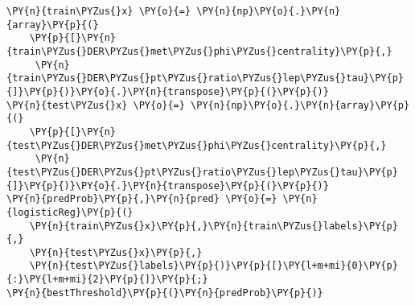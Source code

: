 {\par%
\vspace{-1\baselineskip}%
}%
\begin{notebookcell}[]%
\begin{addmargin}[\cellleftmargin]{0em}%
{\smaller%
\par%
%
\vspace{-1\smallerfontscale}%
\begin{Verbatim}[commandchars=\\\{\}]
\PY{n}{train\PYZus{}x} \PY{o}{=} \PY{n}{np}\PY{o}{.}\PY{n}{array}\PY{p}{(}
    \PY{p}{[}\PY{n}{train\PYZus{}DER\PYZus{}met\PYZus{}phi\PYZus{}centrality}\PY{p}{,}
     \PY{n}{train\PYZus{}DER\PYZus{}pt\PYZus{}ratio\PYZus{}lep\PYZus{}tau}\PY{p}{]}\PY{p}{)}\PY{o}{.}\PY{n}{transpose}\PY{p}{(}\PY{p}{)}
\PY{n}{test\PYZus{}x} \PY{o}{=} \PY{n}{np}\PY{o}{.}\PY{n}{array}\PY{p}{(}
    \PY{p}{[}\PY{n}{test\PYZus{}DER\PYZus{}met\PYZus{}phi\PYZus{}centrality}\PY{p}{,}
     \PY{n}{test\PYZus{}DER\PYZus{}pt\PYZus{}ratio\PYZus{}lep\PYZus{}tau}\PY{p}{]}\PY{p}{)}\PY{o}{.}\PY{n}{transpose}\PY{p}{(}\PY{p}{)}
\PY{n}{predProb}\PY{p}{,}\PY{n}{pred} \PY{o}{=} \PY{n}{logisticReg}\PY{p}{(}
    \PY{n}{train\PYZus{}x}\PY{p}{,}\PY{n}{train\PYZus{}labels}\PY{p}{,}
    \PY{n}{test\PYZus{}x}\PY{p}{,}
    \PY{n}{test\PYZus{}labels}\PY{p}{)}\PY{p}{[}\PY{l+m+mi}{0}\PY{p}{:}\PY{l+m+mi}{2}\PY{p}{]}\PY{p}{;}
\PY{n}{bestThreshold}\PY{p}{(}\PY{n}{predProb}\PY{p}{)}
\end{Verbatim}
%
\par%
\vspace{-1\smallerfontscale}}%
\end{addmargin}
\end{notebookcell}



